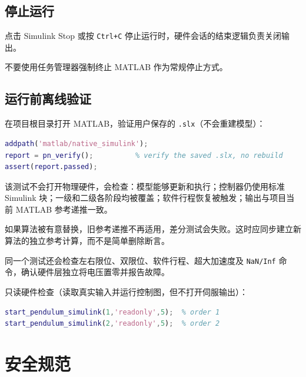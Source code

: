 \documentclass[12pt,a4paper]{article}
\begin{document}
\subsection{停止运行}

点击 Simulink Stop 或按 \texttt{Ctrl+C} 停止运行时，硬件会话的结束逻辑负责关闭输出。

\begin{warnbox}
    不要使用任务管理器强制终止 MATLAB 作为常规停止方式。
\end{warnbox}

\subsection{运行前离线验证}

在项目根目录打开 MATLAB，验证用户保存的 \texttt{.slx}（不会重建模型）：

\begin{lstlisting}[language=Matlab, caption={实机模型离线验证与只读模式}, label={lst:pnverify}]
addpath('matlab/native_simulink');
report = pn_verify();          % verify the saved .slx, no rebuild
assert(report.passed);
\end{lstlisting}

该测试不会打开物理硬件，会检查：模型能够更新和执行；控制器仍使用标准 Simulink 块；一级和二级各阶段均被覆盖；软件行程恢复被触发；输出与项目当前 MATLAB 参考递推一致。

\begin{warnbox}
    如果算法被有意替换，旧参考递推不再适用，差分测试会失败。这时应同步建立新算法的独立参考计算，而不是简单删除断言。
\end{warnbox}

同一个测试还会检查左右限位、双限位、软件行程、超大加速度及 \texttt{NaN/Inf} 命令，确认硬件层独立将电压置零并报告故障。

只读硬件检查（读取真实输入并运行控制图，但不打开伺服输出）：

\begin{lstlisting}[language=Matlab, caption={只读硬件检查}, label={lst:readonly}]
start_pendulum_simulink(1,'readonly',5);  % order 1
start_pendulum_simulink(2,'readonly',5);  % order 2
\end{lstlisting}

\section{安全规范}
\label{sec:safety}
\end{document}
